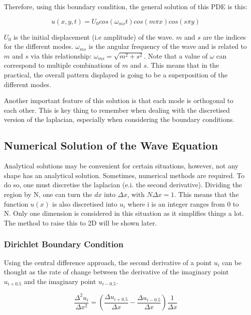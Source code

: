 Therefore, using this boundary condition, the general solution of this PDE is this:

\begin{equation}
    u(x,y,t) = U_0 cos(\omega_{ms}t)cos(m\pi x)cos(s\pi y)
\end{equation}

$U_0$ is the initial displacement (i.e amplitude) of the wave. $m$ and $s$ are the indices for the different modes. $\omega_{ms}$ is the angular frequency of the wave and is related to $m$ and $s$ via this relationship: $\omega_{ms} = \sqrt{m^2+s^2}$. Note that a value of $\omega$ can correspond to multiple combinations of $m$ and $s$. This means that in the practical, the overall pattern displayed is going to be a superposition of the different modes.

Another important feature of this solution is that each mode is orthogonal to each other. This is key thing to remember when dealing with the discretised version of the laplacian, especially when considering the boundary conditions.

\subsection{Numerical Solution of the Wave Equation}
Analytical solutions may be convenient for certain situations, however, not any shape has an analytical solution. Sometimes, numerical methods are required. To do so, one must discretise the laplacian (e.i. the second derivative). Dividing the region by N, one can turn the $dx$ into $\Delta x$, with $N\Delta x = 1$. This means that the function $u(x)$ is also discretised into $u_i$ where i is an integer ranges from 0 to N. Only one dimension is considered in this situation as it simplifies things a lot. The method to raise this to 2D will be shown later.

\subsubsection{Dirichlet Boundary Condition}
Using the central difference approach, the second derivative of a point $u_i$ can be thought as the rate of change between the derivative of the imaginary point $u_{i+0.5}$ and the imaginary point $u_{i-0.5}$.

\begin{equation}
    \frac{\Delta^2 u_i}{\Delta x^2} = (\frac{\Delta u_{i+0.5}}{\Delta x} - \frac{\Delta u_{i-0.5}}{\Delta x}) \frac{1}{\Delta x} \label{eq:centraldiff}
\end{equation}

